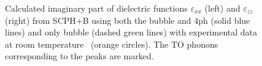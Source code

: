 \begin{figure}[htb]  
\centering
\begin{subcaptionblock}{0.48\linewidth}
 \end{subcaptionblock}\hfill
 \begin{subcaptionblock}{0.48\linewidth}
\captionsetup[subfigure]{labelformat=empty}
\end{subcaptionblock}
\caption{Calculated imaginary part of dielectric functions $\varepsilon_{xx}$ (left) and $\varepsilon_{zz}$ (right) from SCPH+B using both the bubble and 4ph (solid blue lines) and only bubble (dashed green lines) with experimental data at room temperature~\cite{kanehara2015Terahertz} (orange circles). The TO phonons corresponding to the peaks are marked.}
\label{fig:diel_without4ph}
\end{figure}